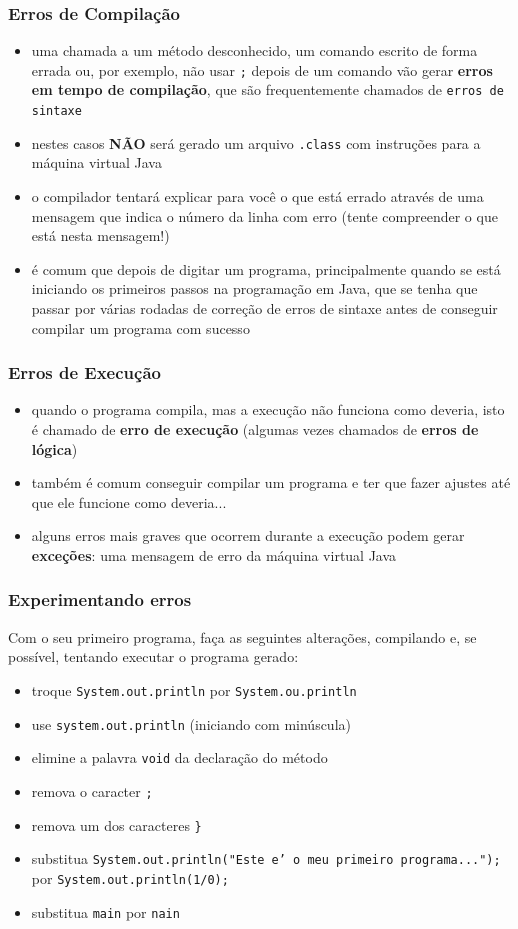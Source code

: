 \documentclass[aspectratio=169]{beamer}
\begin{document}
\begin{frame}\frametitle{Erros de Compilação}
\begin{itemize}
	\item uma chamada a um método desconhecido, um comando escrito de forma errada ou, por exemplo, não usar \texttt{;} depois de um comando vão gerar \textbf{erros em tempo de compilação}, que são frequentemente chamados de \texttt{erros de sintaxe}
	\item nestes casos \textbf{NÃO} será gerado um arquivo \texttt{.class} com instruções para a máquina virtual Java
	\item o compilador tentará explicar para você o que está errado através de uma mensagem que indica o número da linha com erro (tente compreender o que está nesta mensagem!)
	\item é comum que depois de digitar um programa, principalmente quando se está iniciando os primeiros passos na programação em Java, que se tenha que passar por várias rodadas de correção de erros de sintaxe antes de conseguir compilar um programa com sucesso
\end{itemize}
\end{frame}

\begin{frame}\frametitle{Erros de Execução}
\begin{itemize}
	\item quando o programa compila, mas a execução não funciona como deveria, isto é chamado de \textbf{erro de execução} (algumas vezes chamados de \textbf{erros de lógica})
	\item também é comum conseguir compilar um programa e ter que fazer ajustes até que ele funcione como deveria...
	\item alguns erros mais graves que ocorrem durante a execução podem gerar \textbf{exceções}: uma mensagem de erro da máquina virtual Java
\end{itemize}
\end{frame}

\begin{frame}\frametitle{Experimentando erros}
Com o seu primeiro programa, faça as seguintes alterações, compilando e, se possível, tentando executar o programa gerado:
\begin{itemize}
	\item troque \texttt{System.out.println} por \texttt{System.ou.println}
	\item use \texttt{system.out.println} (iniciando com minúscula)
	\item elimine a palavra \texttt{void} da declaração do método
	\item remova o caracter \texttt{;}
	\item remova um dos caracteres \texttt{\}}
	\item substitua \texttt{System.out.println("Este e' o meu primeiro programa...");} por \texttt{System.out.println(1/0);}
	\item substitua \texttt{main} por \texttt{nain}
\end{itemize}
\end{frame}
\end{document}
